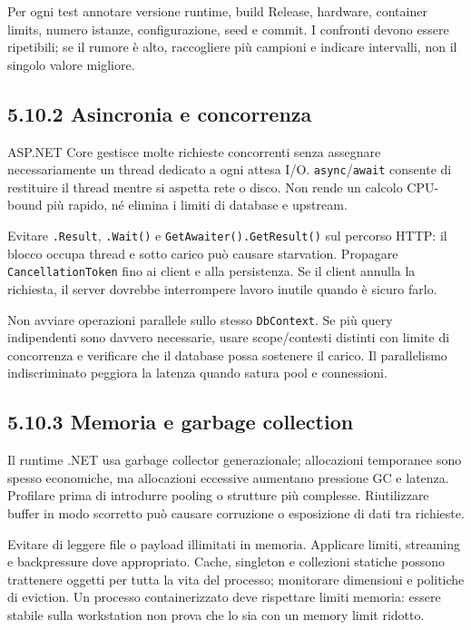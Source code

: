 \documentclass[
  italian,
  10pt,
]{book}
\begin{document}
Per ogni test annotare versione runtime, build Release, hardware,
container limits, numero istanze, configurazione, seed e commit. I
confronti devono essere ripetibili; se il rumore è alto, raccogliere più
campioni e indicare intervalli, non il singolo valore migliore.

\subsection{5.10.2 Asincronia e
concorrenza}\label{asincronia-e-concorrenza}

ASP.NET Core gestisce molte richieste concorrenti senza assegnare
necessariamente un thread dedicato a ogni attesa I/O.
\texttt{async}/\texttt{await} consente di restituire il thread mentre si
aspetta rete o disco. Non rende un calcolo CPU-bound più rapido, né
elimina i limiti di database e upstream.

Evitare \texttt{.Result}, \texttt{.Wait()} e
\texttt{GetAwaiter().GetResult()} sul percorso HTTP: il blocco occupa
thread e sotto carico può causare starvation. Propagare
\texttt{CancellationToken} fino ai client e alla persistenza. Se il
client annulla la richiesta, il server dovrebbe interrompere lavoro
inutile quando è sicuro farlo.

Non avviare operazioni parallele sullo stesso \texttt{DbContext}. Se più
query indipendenti sono davvero necessarie, usare scope/contesti
distinti con limite di concorrenza e verificare che il database possa
sostenere il carico. Il parallelismo indiscriminato peggiora la latenza
quando satura pool e connessioni.

\subsection{5.10.3 Memoria e garbage
collection}\label{memoria-e-garbage-collection}

Il runtime .NET usa garbage collector generazionale; allocazioni
temporanee sono spesso economiche, ma allocazioni eccessive aumentano
pressione GC e latenza. Profilare prima di introdurre pooling o
strutture più complesse. Riutilizzare buffer in modo scorretto può
causare corruzione o esposizione di dati tra richieste.

Evitare di leggere file o payload illimitati in memoria. Applicare
limiti, streaming e backpressure dove appropriato. Cache, singleton e
collezioni statiche possono trattenere oggetti per tutta la vita del
processo; monitorare dimensioni e politiche di eviction. Un processo
containerizzato deve rispettare limiti memoria: essere stabile sulla
workstation non prova che lo sia con un memory limit ridotto.
\end{document}
